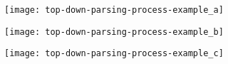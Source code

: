 \documentclass[border=3pt]{standalone}
\begin{document}
\begin{figure}
  \centering
  \begin{subfigure}[b]{0.32\linewidth}
    \centering
    \texttt{[image: top-down-parsing-process-example\_a]}
    \caption{}
  \end{subfigure}
  \begin{subfigure}[b]{0.32\linewidth}
    \centering
    \texttt{[image: top-down-parsing-process-example\_b]}
    \caption{}
  \end{subfigure}
  \begin{subfigure}[b]{0.32\linewidth}
    \centering
    \texttt{[image: top-down-parsing-process-example\_c]}
    \caption{}
  \end{subfigure}
\end{figure}
\end{document}
